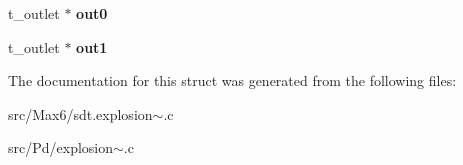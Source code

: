 \begin{DoxyCompactItemize}
\item 
\hypertarget{struct__explosion_a6af9a9095f07d4ff9044afa8f70690da}{}t\+\_\+outlet $\ast$ {\bfseries out0}\label{struct__explosion_a6af9a9095f07d4ff9044afa8f70690da}

\item 
\hypertarget{struct__explosion_a0911a1b2754eb05fc43835c9f25e805c}{}t\+\_\+outlet $\ast$ {\bfseries out1}\label{struct__explosion_a0911a1b2754eb05fc43835c9f25e805c}

\end{DoxyCompactItemize}


The documentation for this struct was generated from the following files\+:\begin{DoxyCompactItemize}
\item 
src/\+Max6/sdt.\+explosion$\sim$.\+c\item 
src/\+Pd/explosion$\sim$.\+c\end{DoxyCompactItemize}
